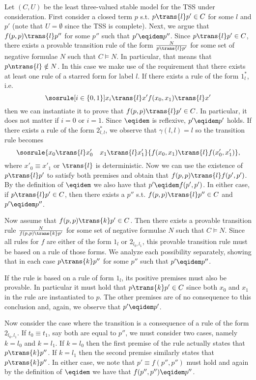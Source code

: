 Let $(C,U)$ be the least three-valued stable model for the TSS under consideration.
First consider a closed term $p$ s.t. $p \trans{l} p' \in C$ for some $l$ and $p'$ (note that $U=\emptyset$ since the TSS is complete).
Next, we argue that $f(p,p) \trans{l} p''$ for some $p''$ such that  $p' \eqidem p''$.
Since $p \trans{l} p' \in C$, there exists a provable transition rule of the form $\frac{N}{p \trans{l} p'}$ for some set of negative formulae $N$ such that $C \vDash N$.
In particular, that means that $p \ntrans{l} \notin N$.
In this case we make use of the requirement that there exists at least one rule of a starred form for label $l$. If there exists a
rule of the form $1_l^*$, i.e.
\[
    \sosrule[i\in\{0,1\}]{x_i\trans{l}x'}{f(x_0,x_1)\trans{l}x'}
\]
then we can instantiate it to prove that $f(p,p)\trans{l}p'\in C$.
In particular, it does not matter if $i=0$ or $i=1$.
Since $\eqidem$ is reflexive, $p'\eqidem p'$ holds.
If there exists a rule of the form $2_{l,l}^*$, we observe that $\gamma(l,l) = l$ so the transition rule becomes
\[
    \sosrule{x_0\trans{l}x_0' \quad x_1\trans{l}x_1'}{f(x_0,x_1) \trans{l} f(x_0',x_1')},
\]
where $x'_0 \equiv x'_1$ or $\trans{l}$ is deterministic.
Now we can use the existence of $p\trans{l}p'$ to satisfy both premises and obtain that $f(p,p)\trans{l}f(p',p')$.
By the definition of $\eqidem$ we also have that $p' \eqidem f(p',p')$.
In either case, if $p \trans{l} p'\in C$, then there exists a $p''$ s.t. $f(p,p) \trans{l} p'' \in C$ and $p' \eqidem p''$.

Now assume that $f(p,p) \trans{k} p' \in C$. Then there exists a provable transition rule $\frac{N}{f(p,p) \trans{k} p'}$
for some set of negative formulae $N$ such that $C\vDash N$. Since all rules for $f$ are either of the form $1_l$ or $2_{l_0,l_1}$,
this provable transition rule must be based on a rule of those forms. We analyze each possibility separately, showing that
in each case $p \trans{k} p''$ for some $p''$ such that $p' \eqidem p''$.

If the rule is based on a rule of form $1_l$, its positive premises must also be provable. In particular it must hold that
$p\trans{k} p' \in C$ since both $x_0$ and $x_1$ in the rule are instantiated to $p$. The other premises are of no
consequence to this conclusion and, again, we observe that $p'\eqidem p'$.

Now consider the case where the transition is a consequence of a rule of the form $2_{l_0,l_1}$.
If $t_0\equiv t_1$, say both are equal to $p''$, we must consider two cases, namely $k=l_0$ and $k=l_1$.
If $k=l_0$ then the first premise of the rule actually states that $p\trans{k}p''$.
If $k=l_1$ then the second premise similarly states that $p\trans{k}p''$.
In either case, we note that $p'\equiv f(p'',p'')$ must hold and again by the definition of $\eqidem$ we have
that $f(p'',p'')\eqidem p''$.

